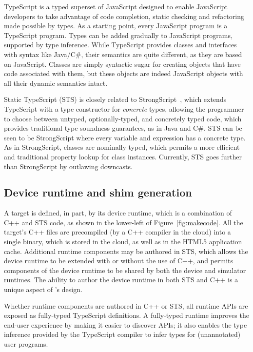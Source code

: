TypeScript is a typed superset of JavaScript designed to enable JavaScript developers to take advantage of code
completion, static checking and refactoring made possible by types.
As a starting point, every JavaScript program is a TypeScript program.  Types can be added gradually to
JavaScript programs, supported by type inference. 
While TypeScript provides classes and interfaces with syntax like
Java/C\#, their semantics are quite different, as they are based on JavaScript. Classes are simply syntactic sugar for creating objects that have code associated with them, but these objects are indeed
JavaScript objects with all their dynamic semantics intact.

Static TypeScript (STS) is closely related to Strong\-Script~\cite{StrongScriptECOOP15}, which extends TypeScript with a type constructor for \emph{concrete} types, allowing the programmer to choose between untyped, optionally-typed, and concretely typed code, which provides traditional type soundness guarantees, as in Java and C\#. STS can be seen to be StrongScript where every variable and expression has a concrete type. As in StrongScript, classes are nominally typed, which permits a more efficient and traditional property lookup for class instances. Currently, STS goes further than StrongScript by outlawing downcasts.

\subsection{Device runtime and shim generation}
\label{sec:shim-gen}

A \MC target is defined, in part, by its device runtime, which is a combination of C++ and STS code, as shown in the lower-left of Figure~\ref{fig:makecode}. All the target's C++ files are precompiled (by a C++ compiler in the cloud) into a single binary, which is stored in the cloud, as well as in the HTML5 application cache. Additional runtime components may be authored in STS, which allows the device runtime to be extended with or without the use of C++, and permits components of the device runtime to be shared by both the device and simulator runtimes. The ability to author the device runtime in both STS and C++ is a unique aspect of \MCN's design.

Whether runtime components are authored in C++ or STS, all runtime APIs are exposed as fully-typed TypeScript definitions. A fully-typed runtime improves the end-user experience by making it easier to discover APIs; it also enables the type inference provided by the TypeScript compiler to infer types for (unannotated) user programs.

